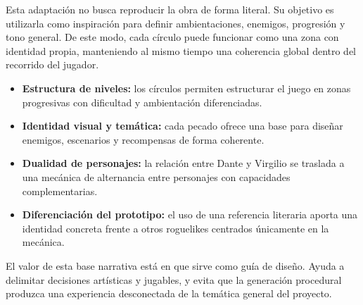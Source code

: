 Esta adaptación no busca reproducir la obra de forma literal. Su objetivo es utilizarla
como inspiración para definir ambientaciones, enemigos, progresión y tono general. De este
modo, cada círculo puede funcionar como una zona con identidad propia, manteniendo al mismo
tiempo una coherencia global dentro del recorrido del jugador.

\begin{itemize}
    \item \textbf{Estructura de niveles:} los círculos permiten estructurar el juego en
    zonas progresivas con dificultad y ambientación diferenciadas.
    
    \item \textbf{Identidad visual y temática:} cada pecado ofrece una base para diseñar
    enemigos, escenarios y recompensas de forma coherente.
    
    \item \textbf{Dualidad de personajes:} la relación entre Dante y Virgilio se traslada a
    una mecánica de alternancia entre personajes con capacidades complementarias.
    
    \item \textbf{Diferenciación del prototipo:} el uso de una referencia literaria aporta
    una identidad concreta frente a otros roguelikes centrados únicamente en la mecánica.
\end{itemize}

El valor de esta base narrativa está en que sirve como guía de diseño. Ayuda a delimitar
decisiones artísticas y jugables, y evita que la generación procedural produzca una
experiencia desconectada de la temática general del proyecto.
